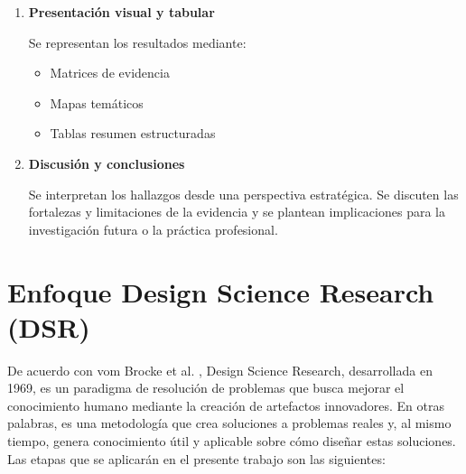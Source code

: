 \begin{enumerate}[resume]
    \item \textbf{Presentación visual y tabular}

    Se representan los resultados mediante:
    \begin{itemize}
        \item Matrices de evidencia
        \item Mapas temáticos
        \item Tablas resumen estructuradas
    \end{itemize}

    \item \textbf{Discusión y conclusiones}

    Se interpretan los hallazgos desde una perspectiva estratégica. Se discuten las fortalezas y limitaciones de la evidencia y se plantean implicaciones para la investigación futura o la práctica profesional.
\end{enumerate}










\section{Enfoque Design Science Research (DSR)}
De acuerdo con vom Brocke et al. \cite{vomBrocke2020}, Design Science Research, desarrollada en 1969, es un paradigma de resolución de problemas que busca mejorar el conocimiento humano mediante la creación de artefactos innovadores. En otras palabras, es una metodología que crea soluciones a problemas reales y, al mismo tiempo, genera conocimiento útil y aplicable sobre cómo diseñar estas soluciones. Las etapas que se aplicarán en el presente trabajo son las siguientes:

